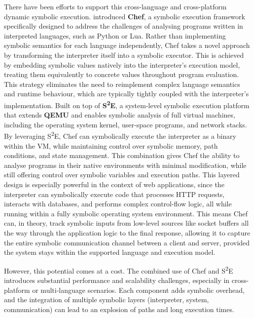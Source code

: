 There have been efforts to support this cross-language and cross-platform dynamic symbolic execution. \citet{bucur_prototyping_2014-1} introduced \textbf{Chef}, a symbolic execution framework specifically designed to address the challenges of analysing programs written in interpreted languages, such as Python or Lua. Rather than implementing symbolic semantics for each language independently, Chef takes a novel approach by transforming the interpreter itself into a symbolic executor. 
This is achieved by embedding symbolic values natively into the interpreter’s execution model, treating them equivalently to concrete values throughout program evaluation. This strategy eliminates the need to reimplement complex language semantics and runtime behaviour, which are typically tightly coupled with the interpreter's implementation.
Built on top of \textbf{S\textsuperscript{2}E}\cite{chipounov_s2e_2011}, a system-level symbolic execution platform that extends \textbf{QEMU} \cite{bellard_qemu_2005} and enables symbolic analysis of full virtual machines, including the operating system kernel, user-space programs, and network stacks. By leveraging S\textsuperscript{2}E, Chef can symbolically execute the interpreter as a binary within the VM, while maintaining control over symbolic memory, path conditions, and state management. This combination gives Chef the ability to analyse programs in their native environments with minimal modification, while still offering control over symbolic variables and execution paths.
This layered design is especially powerful in the context of web applications, since the interpreter can symbolically execute code that processes HTTP requests, interacts with databases, and performs complex control-flow logic, all while running within a fully symbolic operating system environment. This means Chef can, in theory, track symbolic inputs from low-level sources like socket buffers all the way through the application logic to the final response, allowing it to capture the entire symbolic communication channel between a client and server, provided the system stays within the supported language and execution model.

However, this potential comes at a cost. The combined use of Chef and S\textsuperscript{2}E introduces substantial performance and scalability challenges, especially in cross-platform or multi-language scenarios. Each component adds symbolic overhead, and the integration of multiple symbolic layers (interpreter, system, communication) can lead to an explosion of paths and long execution times. 

